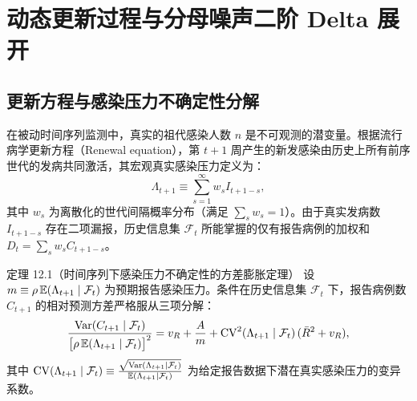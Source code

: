 \section{动态更新过程与分母噪声二阶 Delta 展开}
\label{sec:part12}

\subsection{更新方程与感染压力不确定性分解}

在被动时间序列监测中，真实的祖代感染人数 $n$ 是不可观测的潜变量。根据流行病学更新方程（Renewal equation）\citep{fraser2007estimating, cori2013new}，第 $t+1$ 周产生的新发感染由历史上所有前序世代的发病共同激活，其宏观真实感染压力定义为：
\begin{equation}
  \Lambda_{t+1} \equiv \sum_{s=1}^\infty w_s I_{t+1-s},
\end{equation}
其中 $w_s$ 为离散化的世代间隔概率分布（满足 $\sum_s w_s = 1$）。由于真实发病数 $I_{t+1-s}$ 存在二项漏报，历史信息集 $\mathcal{F}_t$ 所能掌握的仅有报告病例的加权和 $D_t = \sum_s w_s C_{t+1-s}$。

\begin{theorembox}{定理 12.1（时间序列下感染压力不确定性的方差膨胀定理）}
设 $m \equiv \rho\,\mathbb{E}(\Lambda_{t+1} \mid \mathcal{F}_t)$ 为预期报告感染压力。条件在历史信息集 $\mathcal{F}_t$ 下，报告病例数 $C_{t+1}$ 的相对预测方差严格服从三项分解：
\begin{equation}
  \frac{\mathrm{Var}(C_{t+1} \mid \mathcal{F}_t)}{\big[\rho\,\mathbb{E}(\Lambda_{t+1} \mid \mathcal{F}_t)\big]^2} = v_R + \frac{A}{m} + \mathrm{CV}^2(\Lambda_{t+1} \mid \mathcal{F}_t)\,(\bar{R}^2 + v_R),
  \label{eq:info-decomp-der}
\end{equation}
其中 $\mathrm{CV}(\Lambda_{t+1} \mid \mathcal{F}_t) \equiv \frac{\sqrt{\mathrm{Var}(\Lambda_{t+1} \mid \mathcal{F}_t)}}{\mathbb{E}(\Lambda_{t+1} \mid \mathcal{F}_t)}$ 为给定报告数据下潜在真实感染压力的变异系数。
\end{theorembox}

